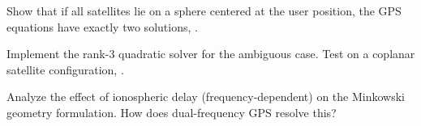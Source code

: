 \begin{exercise}
Show that if all satellites lie on a sphere centered at the user position, the GPS equations have exactly two solutions, \cite{boutin2025gps}.
\end{exercise}

\begin{exercise}
Implement the rank-3 quadratic solver for the ambiguous case. Test on a coplanar satellite configuration, \cite{boutin2025gps}.
\end{exercise}

\begin{exercise}[Research]
Analyze the effect of ionospheric delay (frequency-dependent) on the Minkowski geometry formulation. How does dual-frequency GPS resolve this? \cite{boutin2025gps}
\end{exercise}